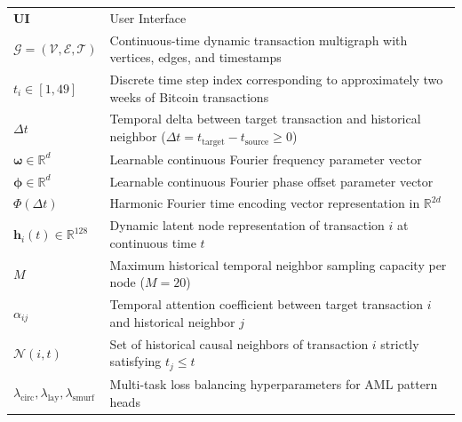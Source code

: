 {\begin{tabular}{lp{11.5cm}}
			\textbf{UI} & User Interface \\
			$\mathcal{G} = (\mathcal{V}, \mathcal{E}, \mathcal{T})$ & Continuous-time dynamic transaction multigraph with vertices, edges, and timestamps \\
			$t_i \in [1, 49]$ & Discrete time step index corresponding to approximately two weeks of Bitcoin transactions \\
			$\Delta t$ & Temporal delta between target transaction and historical neighbor ($\Delta t = t_{\text{target}} - t_{\text{source}} \ge 0$) \\
			$\boldsymbol{\omega} \in \mathbb{R}^d$ & Learnable continuous Fourier frequency parameter vector \\
			$\boldsymbol{\phi} \in \mathbb{R}^d$ & Learnable continuous Fourier phase offset parameter vector \\
			$\Phi(\Delta t)$ & Harmonic Fourier time encoding vector representation in $\mathbb{R}^{2d}$ \\
			$\mathbf{h}_i(t) \in \mathbb{R}^{128}$ & Dynamic latent node representation of transaction $i$ at continuous time $t$ \\
			$M$ & Maximum historical temporal neighbor sampling capacity per node ($M=20$) \\
			$\alpha_{ij}$ & Temporal attention coefficient between target transaction $i$ and historical neighbor $j$ \\
			$\mathcal{N}(i, t)$ & Set of historical causal neighbors of transaction $i$ strictly satisfying $t_j \le t$ \\
			$\lambda_{\text{circ}}, \lambda_{\text{lay}}, \lambda_{\text{smurf}}$ & Multi-task loss balancing hyperparameters for AML pattern heads \\
			\hline
		\end{tabular}
		
}
